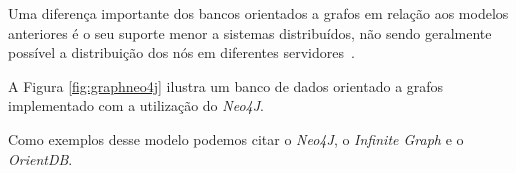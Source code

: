 Uma diferença importante dos bancos orientados a grafos em relação aos modelos anteriores é o seu suporte menor a sistemas distribuídos, não sendo geralmente possível a distribuição dos nós em diferentes servidores~\cite{pramod}.

A Figura \ref{fig:graphneo4j} ilustra um banco de dados orientado a grafos implementado com a utilização do \emph{Neo4J}.

Como exemplos desse modelo podemos citar o \emph{Neo4J}, o \emph{Infinite Graph} e o \emph{OrientDB}.


